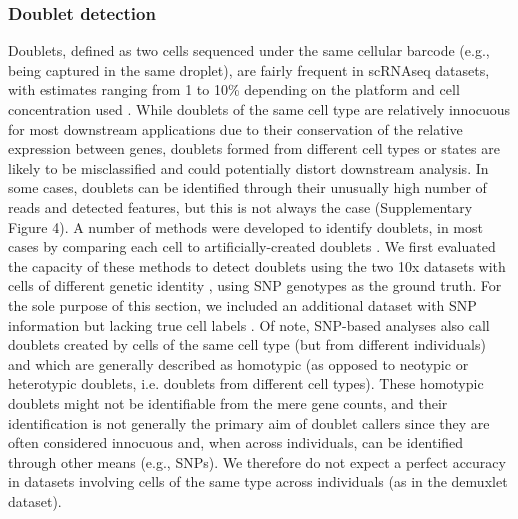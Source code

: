 \documentclass{bmcart}
\begin{document}
\subsubsection*{Doublet detection}

Doublets, defined as two cells sequenced under the same cellular barcode (e.g., being captured in the same droplet), are fairly frequent in scRNAseq datasets, with estimates ranging from 1 to 10\% depending on the platform and cell concentration used \cite{bloomEstimating2018,kangMultiplexedDemuxlet2018}. While doublets of the same cell type are relatively innocuous for most downstream applications due to their conservation of the relative expression between genes, doublets formed from different cell types or states are likely to be misclassified and could potentially distort downstream analysis. In some cases, doublets can be identified through their unusually high number of reads and detected features, but this is not always the case (Supplementary Figure 4). A number of methods were developed to identify doublets, in most cases by comparing each cell to artificially-created doublets \cite{mcginnisDoubletfinder2019, LunScran2016, BaisScds2019}. We first evaluated the capacity of these methods to detect doublets using the two 10x datasets with cells of different genetic identity \cite{tianMixology2018}, using SNP genotypes as the ground truth. For the sole purpose of this section, we included an additional dataset with SNP information but lacking true cell labels \cite{kangMultiplexedDemuxlet2018}. Of note, SNP-based analyses also call doublets created by cells of the same cell type (but from different individuals) and which are generally described as homotypic (as opposed to neotypic or heterotypic doublets, i.e. doublets from different cell types). These homotypic doublets might not be identifiable from the mere gene counts, and their identification is not generally the primary aim of doublet callers since they are often considered innocuous and, when across individuals, can be identified through other means (e.g., SNPs). We therefore do not expect a perfect accuracy in datasets involving cells of the same type across individuals (as in the demuxlet dataset).
\end{document}
